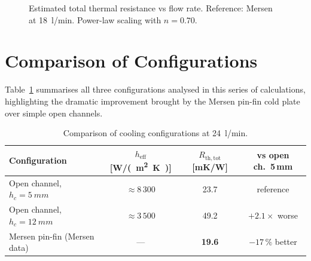 \documentclass[a4paper,11pt]{article}
\begin{document}
\begin{figure}[H]
\centering
{}
\caption{Estimated total thermal resistance vs flow rate. Reference:
         Mersen at \SI{18}{l/min}. Power-law scaling with $n=0.70$.}
\label{fig:rth_vs_flow}
\end{figure}

\section{Comparison of Configurations}

Table~\ref{tab:comparison} summarises all three configurations analysed in this
series of calculations, highlighting the dramatic improvement brought by the Mersen
pin-fin cold plate over simple open channels.

\begin{table}[H]
\centering
\caption{Comparison of cooling configurations at \SI{24}{l/min}.}
\label{tab:comparison}
\begin{tabular}{lccc}
\toprule
Configuration & $h_{\mathrm{eff}}$ [\si{W/(m^2 K)}] & $R_{\mathrm{th,tot}}$ [\si{mK/W}] & vs open ch.\ 5\,mm \\
\midrule
Open channel, $h_c = \SI{5}{mm}$    & $\approx 8\,300$ & 23.7  & reference \\
Open channel, $h_c = \SI{12}{mm}$   & $\approx 3\,500$ & 49.2  & $+2.1\times$ worse \\
Mersen pin-fin (Mersen data)         & ---              & \textbf{19.6}  & $-17\,\%$ better \\
\bottomrule
\end{tabular}
\end{table}
\end{document}
